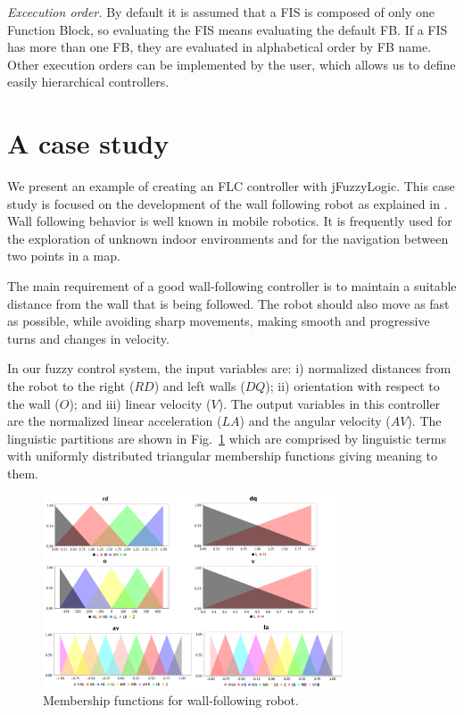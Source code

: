 \documentclass[conference]{IEEEtran}
\begin{document}
\textit{Excecution order.} By default it is assumed that a FIS is composed of only one Function Block, so evaluating the FIS means evaluating the default FB. 
If a FIS has more than one FB, they are evaluated in alphabetical order by FB name. 
Other execution orders can be implemented by the user, which allows us to define easily hierarchical controllers.

\section{A case study}
\label{sec:cas}

We present an example of creating an FLC controller with jFuzzyLogic.
This case study is focused on the development of the wall following robot as explained in \cite{mucientes2009learning}.
Wall following behavior is well known in mobile robotics. 
It is frequently used for the exploration of unknown indoor environments and for the navigation between two points in a map. 

The main requirement of a good wall-following controller is to maintain a suitable distance from the wall that is being followed. 
The robot should also move as fast as possible, while avoiding sharp movements, making smooth and progressive turns and changes in velocity.

In our fuzzy control system, the input variables are: 
	i) normalized distances from the robot to the right ($RD$) and left walls ($DQ$); 
	ii) orientation with respect to the wall ($O$); and 
	iii) linear velocity ($V$). 
The output variables in this controller are the normalized linear acceleration ($LA$) and the angular velocity ($AV$). 
The linguistic partitions are shown in Fig.~\ref{f:robotVars} which are comprised by linguistic terms with uniformly distributed triangular membership functions giving meaning to them.

\begin{figure}[!t]
\centering
\includegraphics[width=3.5in]{figs/robot_vars_2.png}
\caption{Membership functions for wall-following robot.}
\label{f:robotVars}
\end{figure}
\end{document}
